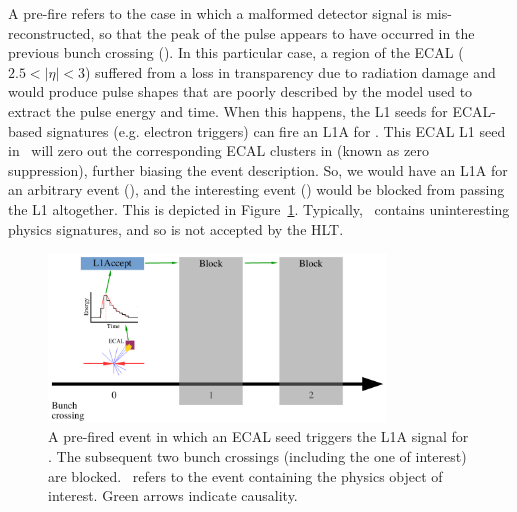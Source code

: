 A pre-fire refers to the case in which a malformed detector signal is mis-reconstructed, so that the peak of the pulse appears to have occurred in the previous bunch crossing ().   
In this particular case, a region of the ECAL ($2.5 < |\eta|<3$) suffered from a loss in transparency due to radiation damage and would produce pulse shapes that are poorly described by the model used to extract the pulse energy and time. 
When this happens, the L1 seeds for ECAL-based signatures (e.g. electron triggers) can fire an L1A for .
This ECAL L1 seed in ~will zero out the corresponding ECAL clusters in  (known as zero suppression), further biasing the event description.
So, we would have an L1A for an arbitrary event (), and the interesting event () would be blocked from passing the L1 altogether. 
This is depicted in Figure~\ref{fig:vbf:pre2}.
Typically, ~contains uninteresting physics signatures, and so is not accepted by the HLT.

\begin{figure}
    \begin{center}
        \includegraphics[width=0.8\textwidth,page=2]{figures/vbf/triggers/l1diag.pdf}
        \caption{A pre-fired event in which an ECAL seed triggers the L1A signal for . 
                 The subsequent two bunch crossings (including the one of interest) are blocked. 
                 ~refers to the event containing the physics object of interest.
                 Green arrows indicate causality.}
        \label{fig:vbf:pre2}
    \end{center}
\end{figure}

